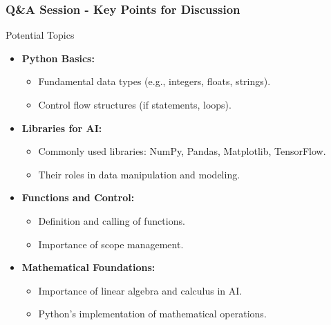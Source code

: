 \documentclass[aspectratio=169]{beamer}
\begin{document}
\begin{frame}[fragile]
    \frametitle{Q\&A Session - Key Points for Discussion}
    \begin{block}{Potential Topics}
        \begin{itemize}
            \item \textbf{Python Basics:}
              \begin{itemize}
                \item Fundamental data types (e.g., integers, floats, strings).
                \item Control flow structures (if statements, loops).
              \end{itemize} 
            \item \textbf{Libraries for AI:}
              \begin{itemize}
                \item Commonly used libraries: NumPy, Pandas, Matplotlib, TensorFlow.
                \item Their roles in data manipulation and modeling.
              \end{itemize}
            \item \textbf{Functions and Control:}
              \begin{itemize}
                \item Definition and calling of functions.
                \item Importance of scope management.
              \end{itemize}
            \item \textbf{Mathematical Foundations:}
              \begin{itemize}
                \item Importance of linear algebra and calculus in AI.
                \item Python's implementation of mathematical operations.
              \end{itemize}
        \end{itemize}
    \end{block}
\end{frame}
\end{document}

